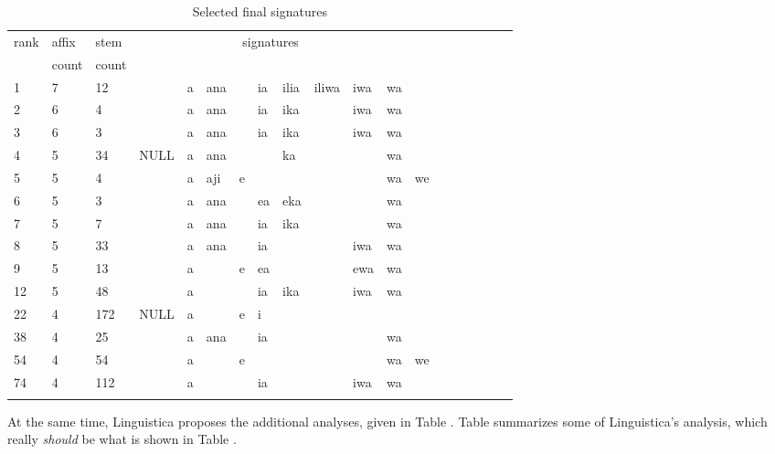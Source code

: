 \documentclass[output=paper,colorlinks,citecolor=brown]{langscibook}
\begin{document}
\begin{table}
\begin{tabular}{lllllllllllllllllll}\lsptoprule
rank& affix & stem   & \multicolumn{9}{c}{signatures} \\ 
 &   count & count & \\ \midrule
1 & 7 & 12 &     & a & ana && ia & ilia & iliwa & iwa & wa   \\
2 & 6&   4  &     & a & ana && ia & ika & & iwa &wa \\
3 & 6& 3  &     & a & ana && ia &ika  & & iwa& wa \\
4 & 5 & 34 & NULL& a & ana && & ka &     & &   wa \\
5 & 5 & 4  &     & a & aji & e & & & && wa & we \\
6 & 5 & 3 &      & a & ana && ea & eka &&& wa \\
7 & 5 & 7 &      & a & ana && ia & 	ika &&& wa \\
8 & 5 & 33 &     & a  & ana &&ia &&& iwa & wa  \\
9 & 5 & 13 &     & a  && e & ea &&& ewa & wa \\ 
12 &5 & 48 & &a &&&ia &ika &&iwa &wa \\
22 & 4 &172 & NULL & a&& e& i \\
38 & 4 &25 &&    a & ana&&  ia&&&&  wa \\
54 & 4 & 54 & & a &&e &&&&&wa & we \\
74 & 4 &  112 && a&&& ia&&& iwa& wa \\
  \lspbottomrule
\end{tabular}
\caption{Selected final signatures}
\label{final-sigs-2}
\end{table}



At the same time, Linguistica proposes the additional analyses, given in Table . Table  summarizes some of Linguistica's 
analysis, which really {\em should} be what is shown in Table .
\end{document}
